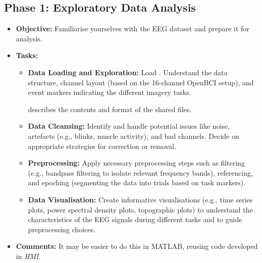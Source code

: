 \documentclass[11pt]{exam}
\begin{document}
    \subsection{Phase 1: Exploratory Data Analysis}
    \begin{itemize}
        \item \textbf{Objective:} Familiarise yourselves with the EEG dataset and prepare it for analysis.
        \item \textbf{Tasks:}
        \begin{itemize}
            \item \textbf{Data Loading and Exploration:} Load \href{https://drive.google.com/drive/folders/1b7Uo\_FO52\_-f4F-DbzYgpeiylx90f\_-n}{}. Understand the data structure, channel layout (based on the 16-channel OpenBCI setup), and event markers indicating the different imagery tasks.

             describes the contents and format of the shared files.

            \item \textbf{Data Cleansing:} Identify and handle potential issues like noise, artefacts (e.g., blinks, muscle activity), and bad channels. Decide on appropriate strategies for correction or removal.
            \item \textbf{Preprocessing:} Apply necessary preprocessing steps such as filtering (e.g., bandpass filtering to isolate relevant frequency bands), referencing, and epoching (segmenting the data into trials based on task markers).
            \item \textbf{Data Visualisation:} Create informative visualisations (e.g., time series plots, power spectral density plots, topographic plots) to understand the characteristics of the EEG signals during different tasks and to guide preprocessing choices.
        \end{itemize}
        \item \textbf{Comments:} It may be easier to do this in MATLAB, reusing code developed in \emph{HMI}.
    \end{itemize}
\end{document}
